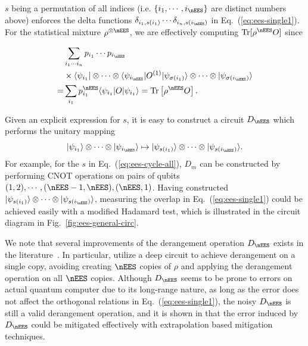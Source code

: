 $s$ being a permutation of all indices (i.e. $\{i_1,\cdots,i_\nEES\}$ are distinct numbers above)
enforces the delta functions $\delta _{i_{1} ,s ( i_{1})} \cdots \delta _{i_{n} ,s ( i_{\nEES})}$
in Eq.~(\ref{eq:ees-single1}).
For the statistical mixture $\rho^{\otimes \nEES}$, we are effectively computing $\operatorname{Tr}[\rho^\nEES O]$ since

\begin{equation}
    \begin{aligned}
          & \sum _{i_{1} \cdots i_{n}} p_{i_{1}} \cdots p_{i_{\nEES}}                                                                                                                         \\
          & \times \langle \psi _{i_{1}} |\otimes \cdots \otimes \langle \psi _{i_{\nEES}} |O^{( 1)} |\psi _{\sigma ( i_{1})} \rangle \otimes \cdots \otimes |\psi _{\sigma ( i_{\nEES})} \rangle \\
        = & \sum _{i_{1}} p_{i_{1}}^{\nEES} \langle \psi _{i_{1}} |O|\psi _{i_{1}} \rangle =\operatorname{Tr}\left[ \rho ^{\nEES} O\right].
    \end{aligned}
\end{equation}

Given an explicit expression for $s$, it is easy to construct a circuit $D_\nEES$ which performs the unitary mapping
\begin{equation}
    |\psi _{i_1} \rangle\otimes \cdots \otimes |\psi _{i_\nEES}\rangle
    \mapsto
    |\psi _{s ( i_{1})} \rangle \otimes \cdots \otimes |\psi _{s ( i_{\nEES})} \rangle.
\end{equation}
For example, for the $s$ in Eq.~(\ref{eq:ees-cycle-all}), $D_m$ can be constructed by
performing CNOT operations on pairs of qubits $(1,2),\cdots,(\nEES-1,\nEES),(\nEES,1)$.
Having constructed $|\psi _{s ( i_{1})} \rangle \otimes \cdots \otimes |\psi _{s ( i_{\nEES})} \rangle$,
measuring the overlap in Eq.~(\ref{eq:ees-single1}) could be achieved easily with a modified
Hadamard test, which is illustrated in the circuit diagram in Fig.~\ref{fig:ees-general-circ}.

We note that several improvements of the derangement operation $D_\nEES$ exists in the literature~\cite{hugginsVirtualDistillationQuantum2021, czarnikQubitefficientExponentialSuppression2021}. In particular,
\citet{czarnikQubitefficientExponentialSuppression2021} utilize a deep circuit to achieve derangement on a single copy, avoiding creating $\nEES$ copies of $\rho$ and applying the derangement operation on all $\nEES$ copies.
Although $D_\nEES$ seems to be prone to errors on actual quantum computer due to its long-range nature,
as long as the error does not affect the orthogonal relations in Eq.~(\ref{eq:ees-single1}), the noisy $D_\nEES$
is still a valid derangement operation, and it is shown in \citet{koczorExponentialErrorSuppression2021}
that the error induced by $D_\nEES$ could be
mitigated effectively with extrapolation based mitigation techniques.


